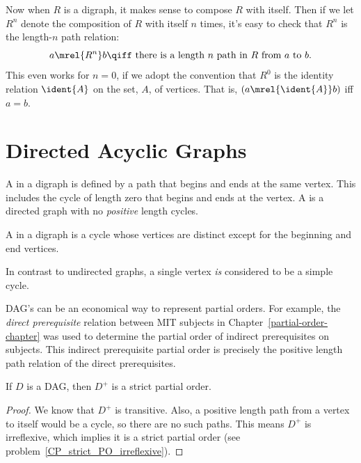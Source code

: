 Now when $R$ is a digraph, it makes sense to compose $R$ with itself.
Then if we let $R^n$ denote the composition of $R$ with itself $n$
times, it's easy to check that $R^n$ is the length-$n$ path relation:
\[
a  \mrel{R^n} b \qiff \mbox{ there is a length $n$ path in $R$ from $a$ to $b$}.
\]
This even works for $n=0$, if we adopt the convention that $R^0$ is
the identity relation $\ident{A}$ on the set, $A$, of vertices.  That
is, $(a \mrel{\ident{A}} b)$ iff $a = b$.

\section{Directed Acyclic Graphs}\label{sec:dag}

\begin{definition}
A  in a digraph is defined by a path that begins and ends
at the same vertex.  This includes the cycle of length zero that
begins and ends at the vertex.  A 
is a directed graph with no \emph{positive} length cycles.

A  in a digraph is a cycle whose vertices are distinct
except for the beginning and end vertices.
\end{definition}

\begin{staffnotes}

In contrast to undirected graphs, a single vertex \emph{is} considered to
be a simple cycle.

\end{staffnotes}

DAG's can be an economical way to represent partial orders.  For
example, the \emph{direct prerequisite} relation between MIT subjects
in Chapter~\ref{partial-order-chapter} was used to determine the
partial order of indirect prerequisites on subjects.  This indirect
prerequisite partial order is precisely the positive length path
relation of the direct prerequisites.

\begin{lemma}
If $D$ is a DAG, then $D^+$ is a strict partial order.
\end{lemma}

\begin{proof}
We know that $D^+$ is transitive.  Also, a positive length path from a
vertex to itself would be a cycle, so there are no such paths.  This means
$D^+$ is irreflexive, which implies it is a strict partial order (see
problem~\ref{CP_strict_PO_irreflexive}).
\end{proof}

